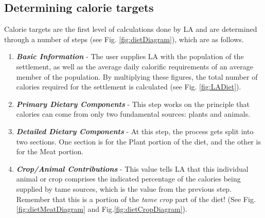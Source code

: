 \subsection{Determining calorie targets}
  Calorie targets are the first level of calculations done by LA and are
determined through a number of steps (see Fig.  \ref{fig:dietDiagram}), which
are as follows.
    \begin{enumerate}
      \item \textbf{\textit{Basic Information}} - The user supplies LA with the
        population of the settlement, as well as the average daily calorific
        requirements of an average member of the population.  By multiplying
        these figures, the total number of calories required for the
        settlement is calculated (see Fig. \ref{fig:LADiet}).
      \item \textbf{\textit{Primary Dietary Components}} - This step works on
        the principle that calories can come from only two fundamental sources:
        plants and animals.
      \item \textbf{\textit{Detailed Dietary Components}} - At this step, the
        process gets split into two sections.  One section is for the Plant
        portion of the diet, and the other is for the Meat portion.
      \item \textbf{\textit{Crop/Animal Contributions}} - This value tells LA
        that this individual animal or crop comprises the indicated percentage of
        the calories being supplied by tame sources, which is the value from the
        previous step. Remember that this is a portion of the \textit{tame crop}
        part of the diet! 
        (See Fig. \ref{fig:dietMeatDiagram} and Fig.\ref{fig:dietCropDiagram}).
    \end{enumerate}


